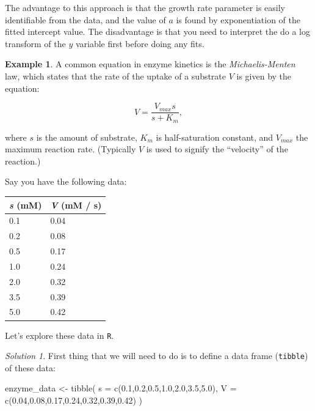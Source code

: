 \documentclass[
]{book}
\newenvironment{Shaded}{\begin{snugshade}}{\end{snugshade}}
\newcommand{\AttributeTok}[1]{\textcolor[rgb]{0.77,0.63,0.00}{#1}}
\newcommand{\FloatTok}[1]{\textcolor[rgb]{0.00,0.00,0.81}{#1}}
\newcommand{\FunctionTok}[1]{\textcolor[rgb]{0.00,0.00,0.00}{#1}}
\newcommand{\NormalTok}[1]{#1}
\newcommand{\OtherTok}[1]{\textcolor[rgb]{0.56,0.35,0.01}{#1}}
\theoremstyle{definition}
\theoremstyle{definition}
\newtheorem{example}{Example}[chapter]
\theoremstyle{definition}
\theoremstyle{remark}
\newtheorem*{solution}{Solution}
\begin{document}
The advantage to this approach is that the growth rate parameter is easily identifiable from the data, and the value of \(a\) is found by exponentiation of the fitted intercept value. The disadvantage is that you need to interpret the do a log transform of the \(y\) variable first before doing any fits.

\begin{example}
\protect\hypertarget{exm:unnamed-chunk-137}{}{\label{exm:unnamed-chunk-137} }A common equation in enzyme kinetics is the \emph{Michaelis-Menten} law, which states that the rate of the uptake of a substrate \(V\) is given by the equation:

\begin{equation}
V = \frac{V_{max} s}{s+K_{m}},
\end{equation}

where \(s\) is the amount of substrate, \(K_{m}\) is half-saturation constant, and \(V_{max}\) the maximum reaction rate. (Typically \(V\) is used to signify the ``velocity'' of the reaction.)

Say you have the following data:

\begin{longtable}[]{@{}ll@{}}
\toprule
\emph{s} (mM) & \emph{V} (mM / s) \\
\midrule
\endhead
0.1 & 0.04 \\
0.2 & 0.08 \\
0.5 & 0.17 \\
1.0 & 0.24 \\
2.0 & 0.32 \\
3.5 & 0.39 \\
5.0 & 0.42 \\
\bottomrule
\end{longtable}

Let's explore these data in \texttt{R}.
\end{example}

\begin{solution}
{}First thing that we will need to do is to define a data frame (\texttt{tibble}) of these data:
\end{solution}

\begin{Shaded}
\begin{Highlighting}[]
\NormalTok{enzyme\_data }\OtherTok{\textless{}{-}} \FunctionTok{tibble}\NormalTok{(}
  \AttributeTok{s =} \FunctionTok{c}\NormalTok{(}\FloatTok{0.1}\NormalTok{,}\FloatTok{0.2}\NormalTok{,}\FloatTok{0.5}\NormalTok{,}\FloatTok{1.0}\NormalTok{,}\FloatTok{2.0}\NormalTok{,}\FloatTok{3.5}\NormalTok{,}\FloatTok{5.0}\NormalTok{),}
  \AttributeTok{V =} \FunctionTok{c}\NormalTok{(}\FloatTok{0.04}\NormalTok{,}\FloatTok{0.08}\NormalTok{,}\FloatTok{0.17}\NormalTok{,}\FloatTok{0.24}\NormalTok{,}\FloatTok{0.32}\NormalTok{,}\FloatTok{0.39}\NormalTok{,}\FloatTok{0.42}\NormalTok{) )}
\end{Highlighting}
\end{Shaded}
\end{document}
